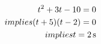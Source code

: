 \documentclass[preview]{standalone}
\begin{document}
\begin{align*}
\special{dvisvgm:raw <g id='unique000'>}t^2 + 3t - 10 = 0 \\implies (t+5)(t-2) = 0 \\implies t = 2\,\mathrm{s}\special{dvisvgm:raw </g>}
\end{align*}
\end{document}
